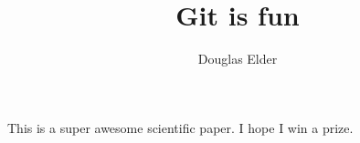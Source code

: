 \documentclass[10pt]{article}
\author{Douglas Elder}
\title{Git is fun}
\begin{document}
	\maketitle
	
	This is a super awesome scientific paper.
	I hope I win a prize.
	
\end{document}
